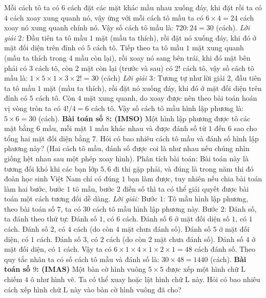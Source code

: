 \begin{multicols}{2}
	\vskip 0.1cm
	Mỗi cách tô ta có $6$ cách đặt các mặt khác mầu nhau xuống đáy, khi đặt rồi ta có $4$ cách xoay xung quanh nó, vậy ứng với mỗi cách tô mầu ta có $6\times4=24$ cách xoay nó xung quanh chính nó. Vậy số cách tô mầu là: $720:24=30$ (cách).
	\vskip 0.1cm
	\textit{Lời giải $2$:}
	\vskip 0.1cm 
	Đầu tiên ta tô mầu $1$ mặt (mầu ta thích), rồi đặt nó xuống đáy, khi đó ở mặt đối diện trên đỉnh có $5$ cách tô.
	\vskip 0.1cm
	Tiếp theo ta tô mầu $1$ mặt xung quanh (mầu ta thích trong $4$ mầu còn lại), rồi xoay nó sang bên trái, khi đó mặt bên phải có $3$ cách tô, còn $2$ mặt còn lại (trước và sau) có $2!$ cách tô, vậy số cách tô mầu là: $1\times5\times1\times3\times2!=30$ (cách)
	\vskip 0.1cm
	\textit{Lời giải $3$:}
	\vskip 0.1cm
	Tương tự như lời giải $2$, đầu tiên ta tô mầu $1$ mặt (mầu ta thích), rồi đặt nó xuống đáy, khi đó ở mặt đối diện trên đỉnh có $5$ cách tô.
	\vskip 0.1cm
	Còn $4$ mặt xung quanh, do xoay được nên theo bài toán hoán vị vòng tròn ta có $4!/4=6$ cách tô.
	\vskip 0.1cm
	Vậy số cách tô mầu hình lập phương là: $5\times 6=30$ (cách).
	\vskip 0.1cm
	\textbf{\color{toancuabi}Bài toán số $8$: (IMSO)}
	\vskip 0.1cm
	Một hình lập phương được tô các mặt bằng $6$ mầu, mỗi mặt $1$ mầu khác nhau và được đánh số từ $1$ đến $6$ sao cho tổng hai mặt đối diện bằng $7$. Hỏi có bao nhiêu cách tô mầu và đánh số hình lập phương này? (Hai cách tô mầu, đánh số được coi là như nhau nếu chúng nhìn giống hệt nhau sau một phép xoay hình). 
	\vskip 0.1cm
	Phân tích bài toán: Bài toán này là tương đối khó khi các bạn lớp $5,6$ đi thi gặp phải, và đúng là trong năm thi đó đoàn học sinh Việt Nam chỉ có đúng $1$ bạn làm được, tuy nhiên nếu chia bài toán làm hai bước, bước $1$ tô mầu, bước $2$ điền số thì ta có thể giải quyết được bài toán một cách tương đối dễ dàng.
	\vskip 0.1cm
	\textit{Lời giải:}
	\vskip 0.1cm 
	Bước $1$: Tô mầu hình lập phương, theo bài toán số $7$, ta có $30$ cách tô mầu hình lập phương này.
	\vskip 0.1cm
	Bước $2$: Đánh số, ta đánh theo thứ tự:
	\vskip 0.1cm
	Đánh số $1$, có $6$ cách. Đánh số $6$ ở mặt đối diện số $1$, có $1$ cách.
	\vskip 0.1cm
	Đánh số $2$, có $4$ cách (do còn $4$ mặt chưa đánh số). Đánh số $5$ ở mặt đối diện, có $1$ cách.
	\vskip 0.1cm
	Đánh số $3$, có $2$ cách (do còn $2$ mặt chưa đánh số). Đánh số $4$ ở mặt đối diện, có $1$ cách.
	\vskip 0.1cm
	Vậy ta có $6\times1\times4\times1\times2\times1=48$ cách đánh số.
	\vskip 0.1cm
	Theo quy tắc nhân ta có số cách tô mầu và đánh số là: $30\times 48=1440$ (cách).
	\vskip 0.1cm
	\textbf{\color{toancuabi}Bài toán số $9$: (IMAS)}
	\vskip 0.1cm
		Một bàn cờ hình vuông $5\times 5$ được xếp một hình chữ L chiếm $4$ ô như hình vẽ. Ta có thể xuay hoặc lật hình chữ L này. Hỏi có bao nhiêu cách xếp hình chữ L này vào bàn cờ hình vuông đã cho?

\end{multicols}

